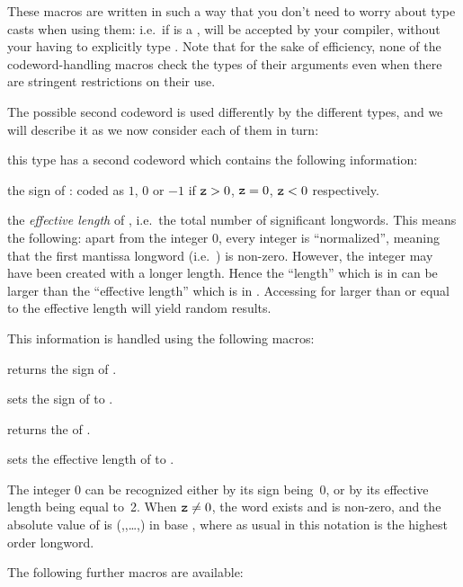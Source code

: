 These macros are written in such a way that you don't need to worry about
type casts when using them: i.e.~if  is a , 
will be accepted by your compiler, without your having to explicitly type
. Note that for the sake of efficiency, none of the
codeword-handling macros check the types of their arguments even when there
are stringent restrictions on their use.

The possible second codeword is used differently by the different types, and
we will describe it as we now consider each of them in turn:


 this type has
a second codeword  which contains the following information:

the sign of : coded as $1$, $0$ or $-1$ if ${\tt z} > 0$, ${\tt z} = 0$,
${\tt z} < 0$ respectively.

the {\it effective length\/} of , i.e.~the total number of significant
longwords. This means the following: apart from the integer 0, every integer
is ``normalized'', meaning that the first mantissa longword (i.e.~)
is non-zero. However, the integer may have been created with a longer length.
Hence the ``length'' which is in  can be larger than the
``effective length'' which is in . Accessing  for 
larger than or equal to the effective length will yield random results.

\noindent This information is handled using the following macros:

 returns the sign of .

 sets the sign of  to .

 returns the  of .

 sets the effective length
of  to .

The integer 0 can be recognized either by its sign being~0, or by its
effective length being equal to~2. When ${\tt z} \ne 0$, the word
 exists and is non-zero, and the absolute value of 
is (,,\dots,) in base
, where as usual in this notation  is
the highest order longword.

\noindent The following further macros are available:

